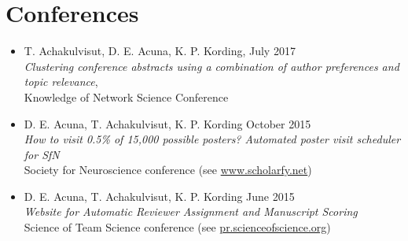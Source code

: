 \section{\sc Conferences}

\begin{itemize}[leftmargin=0cm, label={}]

\item T. Achakulvisut, D. E. Acuna, K. P. Kording, \hfill July 2017\\ {\em Clustering conference abstracts using a combination of author preferences and topic relevance}, \\Knowledge of Network Science Conference

\item D. E. Acuna, T. Achakulvisut, K. P. Kording \hfill October 2015\\
{\em How to visit 0.5\% of 15,000 possible posters? Automated poster visit scheduler for SfN}\\ Society for Neuroscience conference (see \href{http://www.scholarfy.net/}{www.scholarfy.net})

\item D. E. Acuna, T. Achakulvisut, K. P. Kording \hfill June 2015\\
{\em Website for Automatic Reviewer Assignment and Manuscript Scoring}\\
Science of Team Science conference (see \href{http://pr.scienceofscience.org/}{pr.scienceofscience.org})

\end{itemize}